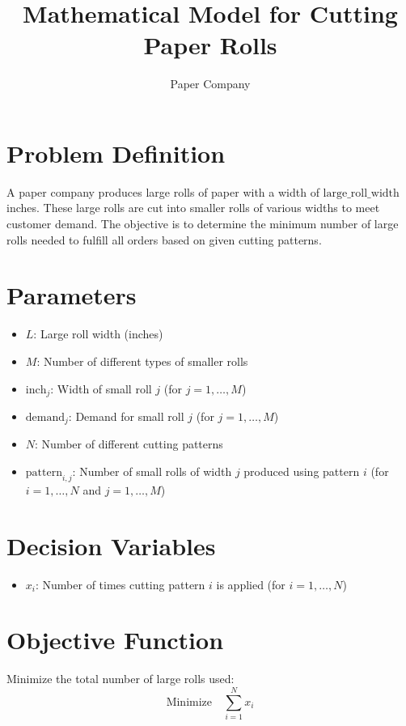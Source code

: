 \documentclass{article}
\begin{document}
\title{Mathematical Model for Cutting Paper Rolls}
\author{Paper Company}
\date{}
\maketitle

\section*{Problem Definition}
A paper company produces large rolls of paper with a width of \( \text{large\_roll\_width} \) inches. These large rolls are cut into smaller rolls of various widths to meet customer demand. The objective is to determine the minimum number of large rolls needed to fulfill all orders based on given cutting patterns.

\section*{Parameters}
\begin{itemize}
    \item \( L \): Large roll width (inches)
    \item \( M \): Number of different types of smaller rolls
    \item \( \text{inch}_j \): Width of small roll \( j \) (for \( j = 1, \ldots, M \))
    \item \( \text{demand}_j \): Demand for small roll \( j \) (for \( j = 1, \ldots, M \))
    \item \( N \): Number of different cutting patterns
    \item \( \text{pattern}_{i,j} \): Number of small rolls of width \( j \) produced using pattern \( i \) (for \( i = 1, \ldots, N \) and \( j = 1, \ldots, M \))
\end{itemize}

\section*{Decision Variables}
\begin{itemize}
    \item \( x_i \): Number of times cutting pattern \( i \) is applied (for \( i = 1, \ldots, N \))
\end{itemize}

\section*{Objective Function}
Minimize the total number of large rolls used:
\[
\text{Minimize} \quad \sum_{i=1}^{N} x_i
\]
\end{document}
